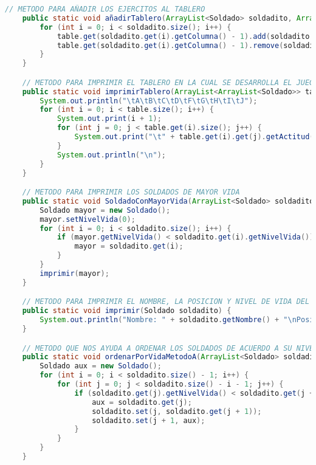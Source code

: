 \documentclass{article}
\begin{document}
\begin{itemize}
\begin{lstlisting}[language=java]
    // METODO PARA AÑADIR LOS EJERCITOS AL TABLERO
    public static void añadirTablero(ArrayList<Soldado> soldadito, ArrayList<ArrayList<Soldado>> table) {
        for (int i = 0; i < soldadito.size(); i++) {
            table.get(soldadito.get(i).getColumna() - 1).add(soldadito.get(i).getFila() - 1, soldadito.get(i));
            table.get(soldadito.get(i).getColumna() - 1).remove(soldadito.get(i).getFila());
        }
    }

    // METODO PARA IMPRIMIR EL TABLERO EN LA CUAL SE DESARROLLA EL JUEGO
    public static void imprimirTablero(ArrayList<ArrayList<Soldado>> table) {
        System.out.println("\tA\tB\tC\tD\tF\tG\tH\tI\tJ");
        for (int i = 0; i < table.size(); i++) {
            System.out.print(i + 1);
            for (int j = 0; j < table.get(i).size(); j++) {
                System.out.print("\t" + table.get(i).get(j).getActitud());
            }
            System.out.println("\n");
        }
    }

    // METODO PARA IMPRIMIR LOS SOLDADOS DE MAYOR VIDA
    public static void SoldadoConMayorVida(ArrayList<Soldado> soldadito) {
        Soldado mayor = new Soldado();
        mayor.setNivelVida(0);
        for (int i = 0; i < soldadito.size(); i++) {
            if (mayor.getNivelVida() < soldadito.get(i).getNivelVida()) {
                mayor = soldadito.get(i);
            }
        }
        imprimir(mayor);
    }

    // METODO PARA IMPRIMIR EL NOMBRE, LA POSICION Y NIVEL DE VIDA DEL SOLDADO
    public static void imprimir(Soldado soldadito) {
        System.out.println("Nombre: " + soldadito.getNombre() + "\nPosicion: " + soldadito.getColumna() + "X" + soldadito.getFila() + "\tVida: " + soldadito.getNivelVida());
    }

    // METODO QUE NOS AYUDA A ORDENAR LOS SOLDADOS DE ACUERDO A SU NIVEL DE VIDA, USUANDO UN ALGORITMO DE ORDENAMIENTO DE BURBUJA
    public static void ordenarPorVidaMetodoA(ArrayList<Soldado> soldadito) {
        Soldado aux = new Soldado();
        for (int i = 0; i < soldadito.size() - 1; i++) {
            for (int j = 0; j < soldadito.size() - i - 1; j++) {
                if (soldadito.get(j).getNivelVida() < soldadito.get(j + 1).getNivelVida()) {
                    aux = soldadito.get(j);
                    soldadito.set(j, soldadito.get(j + 1));
                    soldadito.set(j + 1, aux);
                }
            }
        }
    }


\end{lstlisting}
\end{itemize}
\end{document}

